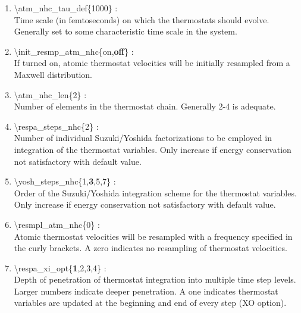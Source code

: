 \documentclass[12pt,titlepage]{article}
\begin{document}
\begin{enumerate}
 \vspace{0.15in} 
 \item   \textbackslash{}atm\_nhc\_tau\_def\{1000\} : \\
  Time scale (in femtoseconds) on which the thermostats should evolve. 
  Generally set to some characteristic time scale in the system.

 \vspace{0.15in} 
 \item   \textbackslash{}init\_resmp\_atm\_nhc\{on,{\bf off}\} : \\
   If turned on, atomic thermostat velocities will be initially resampled from
   a Maxwell distribution.

 \vspace{0.15in} 
 \item   \textbackslash{}atm\_nhc\_len\{2\} : \\
   Number of elements in the thermostat chain.  Generally 2-4 is adequate.

 \vspace{0.15in}
 \item   \textbackslash{}respa\_steps\_nhc\{2\} : \\
     Number of individual Suzuki/Yoshida factorizations to be employed in
     integration of the thermostat variables.  Only
     increase if energy conservation not satisfactory with default value.

 \vspace{0.15in}
 \item   \textbackslash{}yosh\_steps\_nhc\{1,{\bf 3},5,7\} : \\
   Order of the Suzuki/Yoshida integration scheme for the thermostat
   variables.  Only increase if energy conservation not satisfactory with
   default value.

 \vspace{0.15in} 
 \item   \textbackslash{}resmpl\_atm\_nhc\{0\} : \\
   Atomic thermostat velocities will be resampled with a frequency specified
   in the curly brackets.  A zero indicates no resampling of thermostat
   velocities.

 \vspace{0.15in}
 \item   \textbackslash{}respa\_xi\_opt\{{\bf 1},2,3,4\} : \\
   Depth of penetration of thermostat integration into multiple time step
   levels.  Larger numbers indicate deeper penetration.  A one indicates
   thermostat variables are updated at the beginning and end of 
   every step (XO option).


\end{enumerate}
\end{document}
